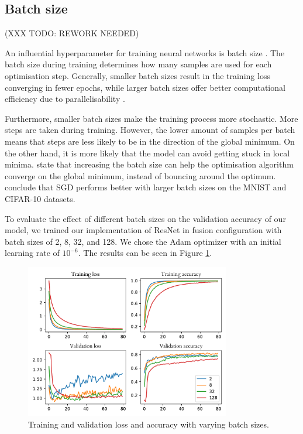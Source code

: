 \documentclass{l4proj}
\begin{document}
\subsection{Batch size}

(XXX TODO: REWORK NEEDED)

An influential hyperparameter for training neural networks is batch size \citep{ioffe_batch_2015}. The batch size during training determines how many samples are used for each optimisation step. Generally, smaller batch sizes result in the training loss converging in fewer epochs, while larger batch sizes offer better computational efficiency due to parallelisability \cite{devarakonda_adabatch_2018}.

Furthermore, smaller batch sizes make the training process more stochastic. More steps are taken during training. However, the lower amount of samples per batch means that steps are less likely to be in the direction of the global minimum. On the other hand, it is more likely that the model can avoid getting stuck in local minima. \citet{smith_dont_2018} state that increasing the batch size can help the optimisation algorithm converge on the global minimum, instead of bouncing around the optimum. \citet{radiuk_impact_2017} conclude that SGD performs better with larger batch sizes on the MNIST and CIFAR-10 datasets.

To evaluate the effect of different batch sizes on the validation accuracy of our model, we trained our implementation of ResNet in fusion configuration with batch sizes of 2, 8, 32, and 128. We chose the Adam optimizer with an initial learning rate of $10^{-6}$. The results can be seen in Figure \ref{fig:batch_size}.

\begin{figure}[ht]
  \centering
  \includegraphics[width=0.8\textwidth]{images/evaluation/batch_size/history}
  \caption{Training and validation loss and accuracy with varying batch sizes.}
  \label{fig:batch_size}
\end{figure}
\end{document}
